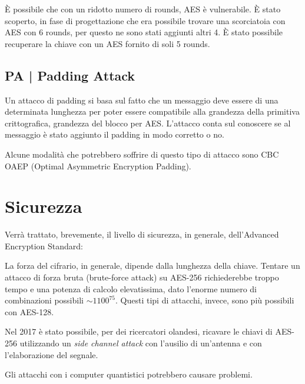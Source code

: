 \textsf{\small È possibile che con un ridotto numero di rounds, AES è vulnerabile. È stato scoperto, in fase di progettazione che era possibile trovare una scorciatoia con AES con 6 rounds, per questo ne sono stati aggiunti altri 4. È stato possibile recuperare la chiave con un AES fornito di soli 5 rounds.}

\subsection{PA | Padding Attack}

\textsf{\small Un attacco di padding si basa sul fatto che un messaggio deve essere di una determinata lunghezza per poter essere compatibile alla grandezza della primitiva crittografica, grandezza del blocco per AES. L'attacco conta sul conoscere se al messaggio è stato aggiunto il padding in modo corretto o no.}

\textsf{\small Alcune modalità che potrebbero soffrire di questo tipo di attacco sono CBC OAEP (Optimal Asymmetric Encryption Padding).} %


\section{Sicurezza}

\textsf{\small Verrà trattato, brevemente, il livello di sicurezza, in generale, dell'Advanced Encryption Standard:}

\textsf{\small La forza del cifrario, in generale, dipende dalla lunghezza della chiave. Tentare un attacco di forza bruta (brute-force attack) su AES-256 richiederebbe troppo tempo e una potenza di calcolo elevatissima, dato l'enorme numero di combinazioni possibili $ \sim 1100^{75} $. Questi tipi di attacchi, invece, sono più possibili con AES-128.}

\textsf{\small Nel 2017 è stato possibile, per dei ricercatori olandesi, ricavare le chiavi di AES-256 utilizzando un \emph{side channel attack} con l'ausilio di un'antenna e con l'elaborazione del segnale.}

\textsf{\small Gli attacchi con i computer quantistici potrebbero causare problemi.}


